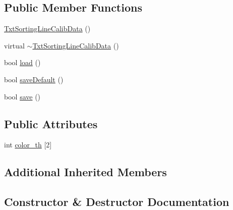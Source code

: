 \subsection*{Public Member Functions}
\begin{DoxyCompactItemize}
\item 
\hyperlink{classft_1_1_txt_sorting_line_calib_data_aa8dc7da7c26677a58e37f51439737829}{Txt\+Sorting\+Line\+Calib\+Data} ()
\item 
virtual \hyperlink{classft_1_1_txt_sorting_line_calib_data_a475787f473ae0d03b22afdaeb9b53dba}{$\sim$\+Txt\+Sorting\+Line\+Calib\+Data} ()
\item 
bool \hyperlink{classft_1_1_txt_sorting_line_calib_data_a2eb432107b17805eac5cae95604db8a5}{load} ()
\item 
bool \hyperlink{classft_1_1_txt_sorting_line_calib_data_a98a160d82617960198b4b58da594d894}{save\+Default} ()
\item 
bool \hyperlink{classft_1_1_txt_sorting_line_calib_data_a14061e6b7938095185e5a07fda80101a}{save} ()
\end{DoxyCompactItemize}
\subsection*{Public Attributes}
\begin{DoxyCompactItemize}
\item 
int \hyperlink{classft_1_1_txt_sorting_line_calib_data_ae6112a6ef434530221946275b47479f7}{color\+\_\+th} \mbox{[}2\mbox{]}
\end{DoxyCompactItemize}
\subsection*{Additional Inherited Members}


\subsection{Constructor \& Destructor Documentation}

